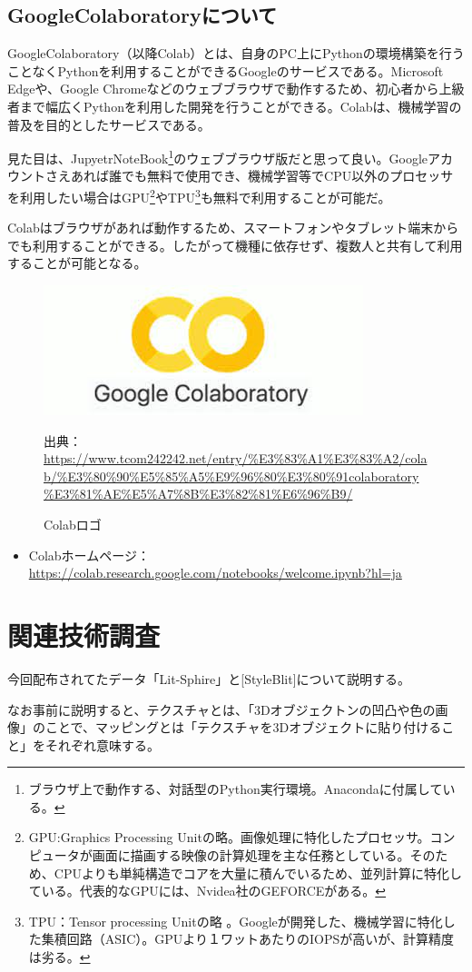 \documentclass[dvipdfmx]{jsarticle}
\begin{document}
\subsection{GoogleColaboratoryについて}
GoogleColaboratory（以降Colab）とは、自身のPC上にPythonの環境構築を行うことなくPythonを利用することができるGoogleのサービスである。Microsoft Edgeや、Google Chromeなどのウェブブラウザで動作するため、初心者から上級者まで幅広くPythonを利用した開発を行うことができる。Colabは、機械学習の普及を目的としたサービスである。\par 見た目は、JupyetrNoteBook\footnote{ブラウザ上で動作する、対話型のPython実行環境。Anacondaに付属している。}のウェブブラウザ版だと思って良い。Googleアカウントさえあれば誰でも無料で使用でき、機械学習等でCPU以外のプロセッサを利用したい場合はGPU\footnote{GPU:Graphics Processing Unitの略。画像処理に特化したプロセッサ。コンピュータが画面に描画する映像の計算処理を主な任務としている。そのため、CPUよりも単純構造でコアを大量に積んでいるため、並列計算に特化している。代表的なGPUには、Nvidea社のGEFORCEがある。}やTPU\footnote{TPU：Tensor processing Unitの略
。Googleが開発した、機械学習に特化した集積回路（ASIC）。GPUより１ワットあたりのIOPSが高いが、計算精度は劣る。}も無料で利用することが可能だ。\par
Colabはブラウザがあれば動作するため、スマートフォンやタブレット端末からでも利用することができる。したがって機種に依存せず、複数人と共有して利用することが可能となる。
\begin{figure}[H]
  \centering
  \includegraphics[scale=0.4]{images/colab_logo.jpeg}
  \caption{Colabロゴ}
  出典：\url{https://www.tcom242242.net/entry/%E3%83%A1%E3%83%A2/colab/%E3%80%90%E5%85%A5%E9%96%80%E3%80%91colaboratory%E3%81%AE%E5%A7%8B%E3%82%81%E6%96%B9/}
\end{figure}
\begin{itemize}
  \item Colabホームページ：\url{https://colab.research.google.com/notebooks/welcome.ipynb?hl=ja}
\end{itemize}
\section{関連技術調査}
今回配布されてたデータ「Lit-Sphire」と[StyleBlit]について説明する。\par
なお事前に説明すると、テクスチャとは、「3Dオブジェクトンの凹凸や色の画像」のことで、マッピングとは「テクスチャを3Dオブジェクトに貼り付けること」をそれぞれ意味する。
\end{document}
